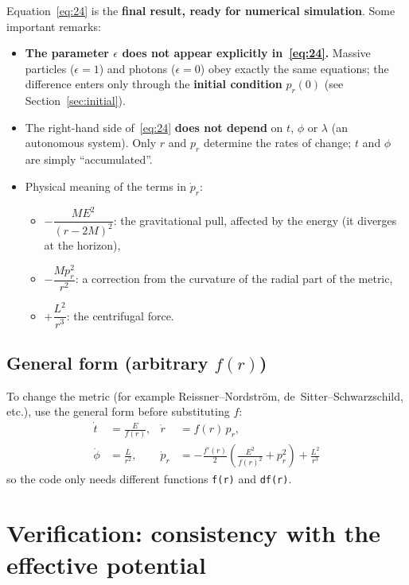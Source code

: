 \documentclass[11pt,a4paper]{article}
\begin{document}
Equation~\eqref{eq:24} is the \textbf{final result, ready for numerical simulation}. Some important remarks:
\begin{itemize}
  \item \textbf{The parameter $\epsilon$ does not appear explicitly in~\eqref{eq:24}.} Massive particles ($\epsilon = 1$) and photons ($\epsilon = 0$) obey exactly the same equations; the difference enters only through the \textbf{initial condition} $p_r(0)$ (see Section~\ref{sec:initial}).
  \item The right-hand side of~\eqref{eq:24} \textbf{does not depend} on $t$, $\phi$ or $\lambda$ (an autonomous system). Only $r$ and $p_r$ determine the rates of change; $t$ and $\phi$ are simply ``accumulated''.
  \item Physical meaning of the terms in $\dot{p}_r$:
  \begin{itemize}
    \item $-\dfrac{ME^2}{(r-2M)^2}$: the gravitational pull, affected by the energy (it diverges at the horizon),
    \item $-\dfrac{M p_r^2}{r^2}$: a correction from the curvature of the radial part of the metric,
    \item $+\dfrac{L^2}{r^3}$: the centrifugal force.
  \end{itemize}
\end{itemize}

\subsection{General form (arbitrary \texorpdfstring{$f(r)$}{f(r)})}

To change the metric (for example Reissner--Nordstr\"om, de~Sitter--Schwarzschild, etc.), use the general form before substituting $f$:
\begin{equation*}
\begin{aligned}
    \dot{t} &= \frac{E}{f(r)}, &
    \dot{r} &= f(r)\, p_r, \\[4pt]
    \dot{\phi} &= \frac{L}{r^2}, &
    \dot{p}_r &= -\frac{f'(r)}{2}\left( \frac{E^2}{f(r)^2} + p_r^2 \right) + \frac{L^2}{r^3}
\end{aligned} \tag{25}\label{eq:25}
\end{equation*}
so the code only needs different functions \texttt{f(r)} and \texttt{df(r)}.

\section{Verification: consistency with the effective potential}
\end{document}

